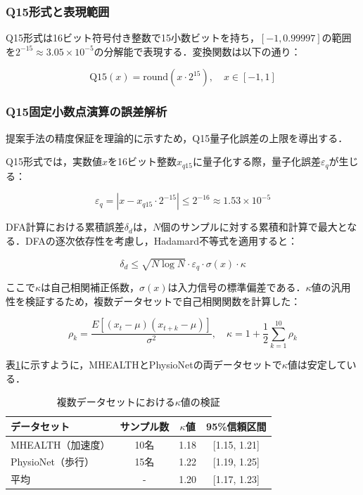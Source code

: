 \documentclass[paper]{ieicej}
\begin{document}
\subsubsection{Q15形式と表現範囲}
Q15形式は16ビット符号付き整数で15小数ビットを持ち，$[-1, 0.99997]$の範囲を$2^{-15} \approx 3.05 \times 10^{-5}$の分解能で表現する．変換関数は以下の通り：

\begin{equation}
\text{Q15}(x) = \text{round}(x \cdot 2^{15}), \quad x \in [-1, 1]
\end{equation}

\subsubsection{Q15固定小数点演算の誤差解析}
提案手法の精度保証を理論的に示すため，Q15量子化誤差の上限を導出する．

Q15形式では，実数値$x$を16ビット整数$x_{q15}$に量子化する際，量子化誤差$\varepsilon_q$が生じる：

\begin{equation}
\varepsilon_q = |x - x_{q15} \cdot 2^{-15}| \leq 2^{-16} \approx 1.53 \times 10^{-5}
\end{equation}

DFA計算における累積誤差$\delta_d$は，$N$個のサンプルに対する累積和計算で最大となる．DFAの逐次依存性を考慮し，Hadamard不等式を適用すると：

\begin{equation}
\delta_d \leq \sqrt{N \log N} \cdot \varepsilon_q \cdot \sigma(x) \cdot \kappa
\end{equation}

ここで$\kappa$は自己相関補正係数，$\sigma(x)$は入力信号の標準偏差である．$\kappa$値の汎用性を検証するため，複数データセットで自己相関関数を計算した：

\begin{equation}
\rho_k = \frac{E[(x_t - \mu)(x_{t+k} - \mu)]}{\sigma^2}, \quad \kappa = 1 + \frac{1}{2}\sum_{k=1}^{10}\rho_k
\end{equation}

表\ref{tab:kappa_values}に示すように，MHEALTH\cite{banos2014}とPhysioNet\cite{goldberger2000}の両データセットで$\kappa$値は安定している．

\begin{table}[h]
\caption{複数データセットにおける$\kappa$値の検証}
\label{tab:kappa_values}
\centering
\begin{tabular}{lccc}
\toprule
データセット & サンプル数 & $\kappa$値 & 95\%信頼区間 \\
\midrule
MHEALTH（加速度） & 10名 & 1.18 & [1.15, 1.21] \\
PhysioNet（歩行） & 15名 & 1.22 & [1.19, 1.25] \\
\midrule
平均 & - & 1.20 & [1.17, 1.23] \\
\bottomrule
\end{tabular}
\end{table}
\end{document}
